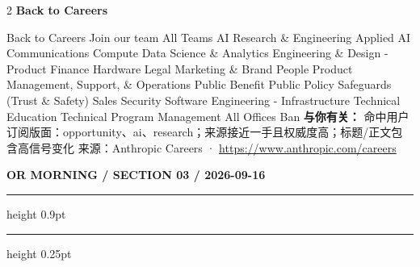 \documentclass[10.5pt]{ctexart}
\begin{document}
\begin{multicols}{2}
\vspace{2mm}
{\large\bfseries Back to Careers}\par
Back to Careers Join our team All Teams AI Research \& Engineering Applied AI Communications Compute Data Science \& Analytics Engineering \& Design - Product Finance Hardware Legal Marketing \& Brand People Product Management, Support, \& Operations Public Benefit Public Policy Safeguards (Trust \& Safety) Sales Security Software Engineering - Infrastructure Technical Education Technical Program Management All Offices Ban
\textbf{与你有关：} 命中用户订阅版面：opportunity、ai、research；来源接近一手且权威度高；标题/正文包含高信号变化
{\footnotesize\color{ormuted} 来源：Anthropic Careers · \url{https://www.anthropic.com/careers}}
\end{multicols}
\newpage
{\small\bfseries OR MORNING / SECTION 03 / 2026-09-16}
\vspace{2mm}
\hrule height 0.9pt
\vspace{1.5mm}
\hrule height 0.25pt
\vspace{4mm}
\end{document}
